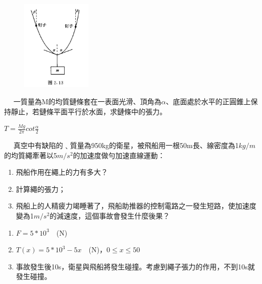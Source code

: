 \documentclass[cn,10pt,math=newtx,chinesefont=founder]{../elegantbook}
\begin{document}
\begin{figure}[htbp]
\flushright
\includegraphics[width=0.3\textwidth]{image/2.13.JPG}
\end{figure}

\newpage


\begin{example}　
    一質量為M的均質鏈條套在一表面光滑、頂角為$\alpha$、底面處於水平的正圓錐上保持靜止，若鏈條平面平行於水面，求鏈條中的張力。
    
    \rightline{[2.1.13]}
\end{example}

\begin{solution}
$T = \frac{Mg}{2\pi}cot\frac{\alpha}{2}$
\end{solution}

\newpage


\begin{example}　
    真空中有缺陷的﹑質量為950kg的衛星，被飛船用一根50m長、線密度為1$kg/m$的均質繩牽著以5$m/s^2$的加速度做勻加速直線運動：
    \begin{enumerate}[label=(\arabic*)]
    \item 飛船作用在繩上的力有多大？
    \item 計算繩的張力；
    \item 飛船上的人精疲力竭睡著了，飛船助推器的控制電路之一發生短路，使加速度變為1$m/s^2$的減速度，這個事故會發生什麼後果？
    \end{enumerate}
    
    \rightline{[2.1.14]}
\end{example}

\begin{solution}
\begin{enumerate}[label=(\arabic*)]
\item $F = 5*10^3$　(N)
\item $T(x) = 5*10^3 - 5x$　(N)，$0 \leq x \leq 50$ 
\item 事故發生後10s，衛星與飛船將發生碰撞。考慮到繩子張力的作用，不到10s就發生碰撞。
\end{enumerate}
\end{solution}
\end{document}
